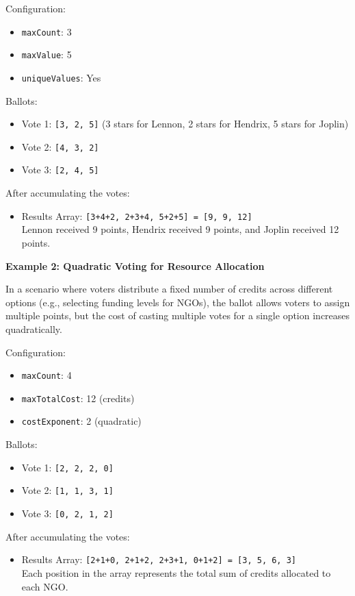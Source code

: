 Configuration:

\begin{itemize}
	\item \texttt{maxCount}: 3
	\item \texttt{maxValue}: 5
	\item \texttt{uniqueValues}: Yes
\end{itemize}

Ballots:

\begin{itemize}
	\item Vote 1: \texttt{[3, 2, 5]} (3 stars for Lennon, 2 stars for Hendrix, 5 stars for Joplin)
	\item Vote 2: \texttt{[4, 3, 2]}
	\item Vote 3: \texttt{[2, 4, 5]}
\end{itemize}

After accumulating the votes:

\begin{itemize}
	\item Results Array: \texttt{[3+4+2, 2+3+4, 5+2+5] = [9, 9, 12]}\\
	Lennon received 9 points, Hendrix received 9 points, and Joplin received 12 points.
\end{itemize}

\textbf{Example 2: Quadratic Voting for Resource Allocation}

In a scenario where voters distribute a fixed number of credits across different options (e.g., selecting funding levels for NGOs), the ballot allows voters to assign multiple points, but the cost of casting multiple votes for a single option increases quadratically.

Configuration:

\begin{itemize}
	\item \texttt{maxCount}: 4
	\item \texttt{maxTotalCost}: 12 (credits)
	\item \texttt{costExponent}: 2 (quadratic)
\end{itemize}

Ballots:

\begin{itemize}
	\item Vote 1: \texttt{[2, 2, 2, 0]}
	\item Vote 2: \texttt{[1, 1, 3, 1]}
	\item Vote 3: \texttt{[0, 2, 1, 2]}
\end{itemize}


After accumulating the votes:


\begin{itemize}
	\item Results Array: \texttt{[2+1+0, 2+1+2, 2+3+1, 0+1+2] = [3, 5, 6, 3]} \\
	Each position in the array represents the total sum of credits allocated to each NGO.
\end{itemize}

